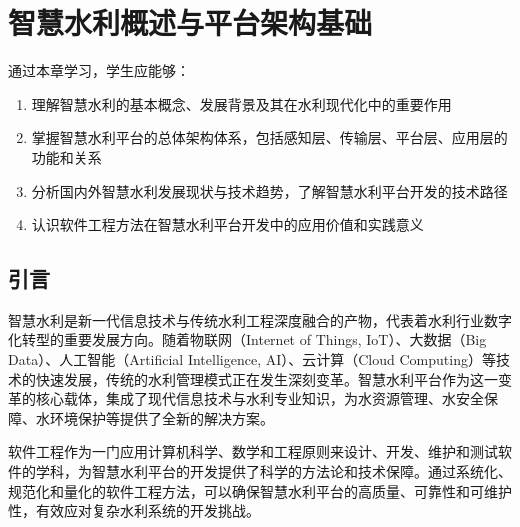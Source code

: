 \chapter{智慧水利概述与平台架构基础}

\begin{learningobjectives}
通过本章学习，学生应能够：
\begin{enumerate}
    \item 理解智慧水利的基本概念、发展背景及其在水利现代化中的重要作用
    \item 掌握智慧水利平台的总体架构体系，包括感知层、传输层、平台层、应用层的功能和关系
    \item 分析国内外智慧水利发展现状与技术趋势，了解智慧水利平台开发的技术路径
    \item 认识软件工程方法在智慧水利平台开发中的应用价值和实践意义
\end{enumerate}
\end{learningobjectives}

\section{引言}

智慧水利是新一代信息技术与传统水利工程深度融合的产物，代表着水利行业数字化转型的重要发展方向。随着物联网（Internet of Things, IoT）、大数据（Big Data）、人工智能（Artificial Intelligence, AI）、云计算（Cloud Computing）等技术的快速发展，传统的水利管理模式正在发生深刻变革。智慧水利平台作为这一变革的核心载体，集成了现代信息技术与水利专业知识，为水资源管理、水安全保障、水环境保护等提供了全新的解决方案。

软件工程作为一门应用计算机科学、数学和工程原则来设计、开发、维护和测试软件的学科，为智慧水利平台的开发提供了科学的方法论和技术保障。通过系统化、规范化和量化的软件工程方法，可以确保智慧水利平台的高质量、可靠性和可维护性，有效应对复杂水利系统的开发挑战。


  
